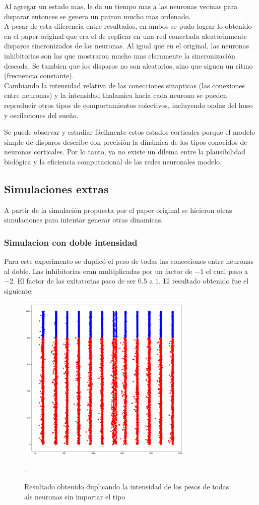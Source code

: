 \documentclass[12pt]{article}
\begin{document}
Al agregar un estado mas, le da un tiempo mas a las neuronas vecinas para disparar entonces se genera un patron mucho mas ordenado. \\

A pesar de esta diferencia entre resultados, en ambos se pudo lograr lo obtenido en el paper original que era el de replicar en una red conectada aleatoriamente disparos sincronizados de las neuronas.
Al igual que en el original, las neuronas inhibitorias son las que mostraron mucho mas claramente la sincronización deseada. Se tambien que los disparos no son aleatorios, sino que siguen un ritmo (frecuencia constante). \\

Cambiando la intensidad relativa de las conecciones sinapticas (las conexiones entre neuronas) y la intensidad thalamica hacia cada neurona se pueden reproducir otros tipos de comportamientos
colectivos, incluyendo ondas del huso y oscilaciones del sueño.

Se puede observar y estudiar fácilmente estos estados corticales porque el modelo simple de disparos describe con precisión la dinámica de los tipos conocidos
de neuronas corticales. Por lo tanto, ya no existe un dilema entre la plausibilidad biológica y la eficiencia computacional de las redes neuronales modelo.

\subsection{Simulaciones extras}
A partir de la simulación propuesta por el paper original se hicieron otras simulaciones para intentar generar otras dinamicas.

\subsubsection{Simulacion con doble intensidad}
Para este experimento se duplicó el peso de todas las conecciones entre neuronas al doble. Las inhibitorias eran multiplicadas por un factor de $-1$ el cual paso a $-2$.
El factor de las exitatorias paso de ser $0.5$ a $1$. El resultado obtenido fue el siguiente:

\begin{figure}[h!]
    \centering
        \includegraphics[height=8cm]{images/resultadoDobleAmbos.png}
    \caption[fontsize=2pt]{Resultado obtenido duplicando la intensidad de los pesos de todas als neuronas sin importar el tipo}.
\end{figure}
\end{document}
